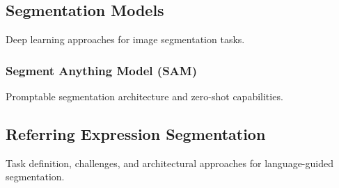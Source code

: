 \subsection{Segmentation Models}

Deep learning approaches for image segmentation tasks.

\subsubsection{Segment Anything Model (SAM)}

Promptable segmentation architecture and zero-shot capabilities.

\subsection{Referring Expression Segmentation}

Task definition, challenges, and architectural approaches for language-guided segmentation.
